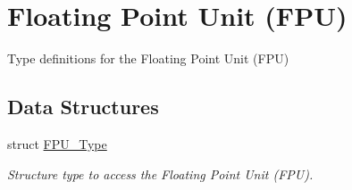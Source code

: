 \hypertarget{group___c_m_s_i_s___f_p_u}{}\section{Floating Point Unit (F\+PU)}
\label{group___c_m_s_i_s___f_p_u}


Type definitions for the Floating Point Unit (F\+PU)  


\subsection*{Data Structures}
\begin{DoxyCompactItemize}
\item 
struct \hyperlink{struct_f_p_u___type}{F\+P\+U\+\_\+\+Type}
\begin{DoxyCompactList}\small\item\em Structure type to access the Floating Point Unit (F\+PU). \end{DoxyCompactList}\end{DoxyCompactItemize}
